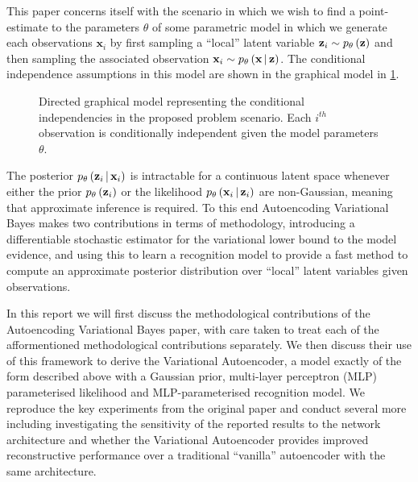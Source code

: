 \documentclass[../report.tex]{subfiles}
\begin{document}
This paper\cite{kingma2013auto} concerns itself with the scenario in which we wish to find a point-estimate to the parameters $\theta$ of some parametric model in which we generate each observations $\mathbf{x}_i$ by first sampling a ``local'' latent variable $\mathbf{z}_i \sim p_\theta \left( \mathbf{z}\right)$ and then sampling the associated observation $\mathbf{x}_i \sim p_\theta \left(\mathbf{x} \, \middle\vert \, \mathbf{z} \right)$. The conditional independence assumptions in this model are shown in the graphical model in \ref{fig:graph}.

\begin{figure}[!htbp]
\centering
{}
\caption{\label{fig:graph}Directed graphical model representing the conditional independencies in the proposed problem scenario. Each $i^{th}$ observation is conditionally independent given the model parameters $\theta$.}
\end{figure}

The posterior $p_\theta \left(\mathbf{z}_i \, \middle\vert \, \mathbf{x}_i \right)$ is intractable for a continuous latent space whenever either the prior $p_\theta \left( \mathbf{z}_i\right)$ or the likelihood $p_\theta \left(\mathbf{x}_i \, \middle\vert \, \mathbf{z}_i \right)$ are non-Gaussian, meaning that approximate inference is required. To this end Autoencoding Variational Bayes makes two contributions in terms of methodology, introducing a differentiable stochastic estimator for the variational lower bound to the model evidence, and using this to learn a recognition model to provide a fast method to compute an approximate posterior distribution over ``local'' latent variables given observations.

In this report we will first discuss the methodological contributions of the Autoencoding Variational Bayes paper, with care taken to treat each of the afformentioned methodological contributions separately. We then discuss their use of this framework to derive the Variational Autoencoder, a model exactly of the form described above with a Gaussian prior, multi-layer perceptron (MLP) parameterised likelihood and MLP-parameterised recognition model. We reproduce the key experiments from the original paper and conduct several more including investigating the sensitivity of the reported results to the network architecture and whether the Variational Autoencoder provides improved reconstructive performance over a traditional ``vanilla'' autoencoder with the same architecture.
\end{document}
